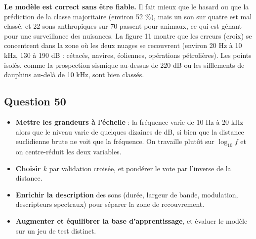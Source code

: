 \documentclass[11pt,a4paper]{article}
\providecommand{\tightlist}{\setlength{\itemsep}{0pt}\setlength{\parskip}{0pt}}
\begin{document}
\textbf{Le modèle est correct sans être fiable.} Il fait mieux que le hasard ou que la prédiction de la classe majoritaire (environ 52 \%), mais un son sur quatre est mal classé, et 22 sons anthropiques sur 70 passent pour animaux, ce qui est gênant pour une surveillance des nuisances. La figure 11 montre que les erreurs (croix) se concentrent dans la zone où les deux nuages se recouvrent (environ 20 Hz à 10 kHz, 130 à 190 dB : cétacés, navires, éoliennes, opérations pétrolières). Les points isolés, comme la prospection sismique au-dessus de 220 dB ou les sifflements de dauphins au-delà de 10 kHz, sont bien classés.

\hypertarget{question-50}{%
\subsection{Question 50}\label{question-50}}

\begin{itemize}
\tightlist
\item
  \textbf{Mettre les grandeurs à l'échelle} : la fréquence varie de 10 Hz à 20 kHz alors que le niveau varie de quelques dizaines de dB, si bien que la distance euclidienne brute ne voit que la fréquence. On travaille plutôt sur \(\log_{10} f\) et on centre-réduit les deux variables.
\item
  \textbf{Choisir \(k\)} par validation croisée, et pondérer le vote par l'inverse de la distance.
\item
  \textbf{Enrichir la description} des sons (durée, largeur de bande, modulation, descripteurs spectraux) pour séparer la zone de recouvrement.
\item
  \textbf{Augmenter et équilibrer la base d'apprentissage}, et évaluer le modèle sur un jeu de test distinct.
\end{itemize}
\end{document}
